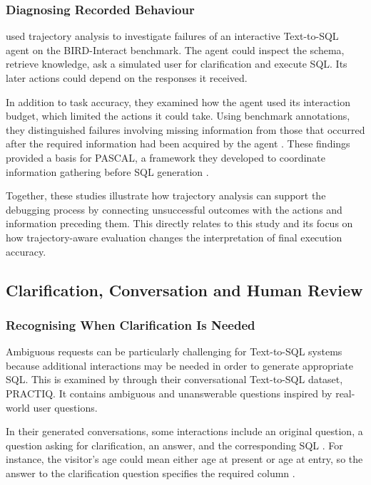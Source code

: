 \subsubsection{Diagnosing Recorded Behaviour}

\citet{yan2026bottleneck} used trajectory analysis to investigate failures
of an interactive Text-to-SQL agent on the BIRD-Interact benchmark.
The agent could inspect the schema, retrieve knowledge,
ask a simulated user for clarification and execute SQL.
Its later actions could depend on the responses it received.

In addition to task accuracy, they examined how the agent used its interaction budget,
which limited the actions it could take.
Using benchmark annotations, they distinguished failures involving missing
information from those that occurred after the required information had been acquired by the agent
\citep[Section~3.1 and Table~2]{yan2026bottleneck}.
These findings provided a basis for PASCAL, a framework they developed
to coordinate information gathering before SQL generation
\citep[Sections~3.2--4]{yan2026bottleneck}.

Together, these studies illustrate how trajectory analysis can support the debugging process
by connecting unsuccessful outcomes with the actions and information
preceding them.
This directly relates to this study and its focus on how trajectory-aware evaluation
changes the interpretation of final execution accuracy.

\subsection{Clarification, Conversation and Human Review}
\label{sec:literature-interaction}

\subsubsection{Recognising When Clarification Is Needed}

Ambiguous requests can be particularly challenging for Text-to-SQL systems
because additional interactions may be needed in order to generate appropriate SQL.
This is examined by \citet{dong2025practiq} through their conversational Text-to-SQL dataset, PRACTIQ.
It contains ambiguous and unanswerable questions inspired by real-world user questions.

In their generated conversations, some interactions include an original question,
a question asking for clarification, an answer, and the corresponding SQL \citep{dong2025practiq}.
For instance, the visitor's age could mean either age at present or age at entry,
so the answer to the clarification question specifies the required column \citep[p.~256, Figure~1]{dong2025practiq}.

